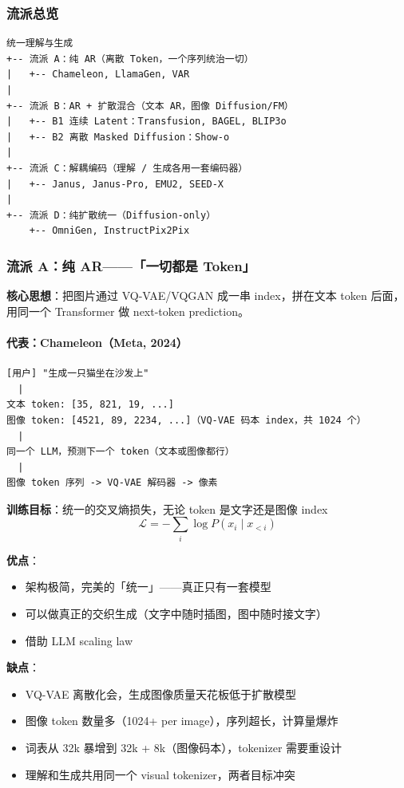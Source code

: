 \subsubsection{流派总览}

\begin{lstlisting}
统一理解与生成
+-- 流派 A：纯 AR（离散 Token，一个序列统治一切）
|   +-- Chameleon, LlamaGen, VAR
|
+-- 流派 B：AR + 扩散混合（文本 AR，图像 Diffusion/FM）
|   +-- B1 连续 Latent：Transfusion, BAGEL, BLIP3o
|   +-- B2 离散 Masked Diffusion：Show-o
|
+-- 流派 C：解耦编码（理解 / 生成各用一套编码器）
|   +-- Janus, Janus-Pro, EMU2, SEED-X
|
+-- 流派 D：纯扩散统一（Diffusion-only）
    +-- OmniGen, InstructPix2Pix
\end{lstlisting}

\subsubsection{流派 A：纯 AR——「一切都是 Token」}

\begin{conceptbox}
\textbf{核心思想}：把图片通过 VQ-VAE/VQGAN 成一串 index，拼在文本 token 后面，用同一个 Transformer 做 next-token prediction。
\end{conceptbox}

\paragraph{代表：Chameleon（Meta, 2024）}

\begin{lstlisting}
[用户] "生成一只猫坐在沙发上"
  |
文本 token: [35, 821, 19, ...]
图像 token: [4521, 89, 2234, ...]（VQ-VAE 码本 index，共 1024 个）
  |
同一个 LLM，预测下一个 token（文本或图像都行）
  |
图像 token 序列 -> VQ-VAE 解码器 -> 像素
\end{lstlisting}

\textbf{训练目标}：统一的交叉熵损失，无论 token 是文字还是图像 index
$$\mathcal{L} = -\sum_{i} \log P(x_i \mid x_{<i})$$

\textbf{优点}：
\begin{itemize}
  \item 架构极简，完美的「统一」——真正只有一套模型
  \item 可以做真正的交织生成（文字中随时插图，图中随时接文字）
  \item 借助 LLM scaling law
\end{itemize}

\begin{warnbox}
\textbf{缺点}：
\begin{itemize}
  \item VQ-VAE 离散化会，生成图像质量天花板低于扩散模型
  \item 图像 token 数量多（1024+ per image），序列超长，计算量爆炸
  \item 词表从 32k 暴增到 32k + 8k（图像码本），tokenizer 需要重设计
  \item 理解和生成共用同一个 visual tokenizer，两者目标冲突
\end{itemize}
\end{warnbox}

